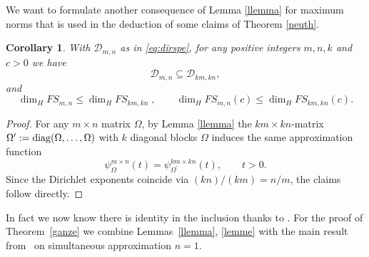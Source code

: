 \documentclass[10pt]{amsart}
\newtheorem{corollary}[theorem]{Corollary}
\theoremstyle{definition}
\begin{document}
We want to formulate another consequence 
of Lemma \ref{llemma} for maximum norms that is used
in the deduction of some claims of Theorem \ref{neuth}.

\begin{corollary} \label{multiples}
   With $\mathcal{D}_{m,n}$ 
   as in \eqref{eq:dirspe}, for any positive integers $m,n,k$ and $c>0$ we have
   \[
   \mathcal{D}_{m,n} \subseteq \mathcal{D}_{km,kn}, 
   \]
   and
   \[
   \dim_H FS_{m,n} \le \dim_H FS_{km,kn} \;, \qquad \dim_H FS_{m,n}(c) \le \dim_H FS_{km,kn}(c).
   \]
\end{corollary}

\begin{proof}
    For any $m\times n$ matrix $\Omega$, by Lemma \ref{llemma} the $km\times kn$-matrix $\Omega^{\prime}:=\rm{diag}(\Omega,\ldots,\Omega)$
    with $k$ diagonal blocks $\Omega$ induces the same approximation function
    \[
    \psi_{\Omega}^{m\times n}(t)= \psi_{\Omega^{\prime} }^{km\times kn}(t), \qquad t>0.
    \]
    Since the Dirichlet exponents coincide via $(kn)/(km)=n/m$, the 
    claims follow directly.
\end{proof}

In fact we now know there is identity in the inclusion
thanks to \cite{AginWeiss2024}.
For the proof of Theorem~\ref{ganze}
we combine Lemmas~\ref{llemma}, \ref{lemme} with the main result from~\cite{j1} on simultaneous approximation $n=1$.
\end{document}
